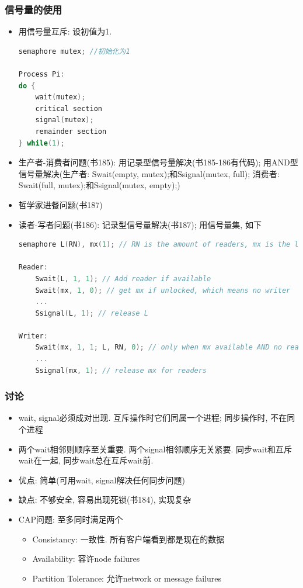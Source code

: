 \documentclass[a4paper, UTF8]{article}
\begin{document}
\subsubsection{信号量的使用}
\begin{itemize}
\item 用信号量互斥: 设初值为1.
\begin{lstlisting}[language=c++]
semaphore mutex; //初始化为1

Process Pi:
do {
	wait(mutex);
	critical section
	signal(mutex);
	remainder section
} while(1);
\end{lstlisting}
\item 生产者-消费者问题(书185): 用记录型信号量解决(书185-186有代码); 用AND型信号量解决(生产者: Swait(empty, mutex);和Ssignal(mutex, full); 消费者: Swait(full, mutex);和Ssignal(mutex, empty);)
\item 哲学家进餐问题(书187)
\item 读者-写者问题(书186): 记录型信号量解决(书187); 用信号量集, 如下
\begin{lstlisting}[language=c++]
semaphore L(RN), mx(1); // RN is the amount of readers, mx is the lock for critical resources.

Reader:
	Swait(L, 1, 1); // Add reader if available
	Swait(mx, 1, 0); // get mx if unlocked, which means no writer
	...
	Ssignal(L, 1); // release L
	
Writer:
	Swait(mx, 1, 1; L, RN, 0); // only when mx available AND no readers are reading
	...
	Ssignal(mx, 1); // release mx for readers
\end{lstlisting}
\end{itemize}

\subsubsection{讨论}
\begin{itemize}
\item wait, signal必须成对出现. 互斥操作时它们同属一个进程; 同步操作时, 不在同个进程
\item 两个wait相邻则顺序至关重要. 两个signal相邻顺序无关紧要. 同步wait和互斥wait在一起, 同步wait总在互斥wait前.
\item 优点: 简单(可用wait, signal解决任何同步问题)
\item 缺点: 不够安全, 容易出现死锁(书184), 实现复杂
\item CAP问题: 至多同时满足两个
	\begin{itemize}
	\item Consistancy: 一致性. 所有客户端看到都是现在的数据
	\item Availability: 容许node failures
	\item Partition Tolerance: 允许network or message failures
	\end{itemize}
\end{itemize}
\end{document}
